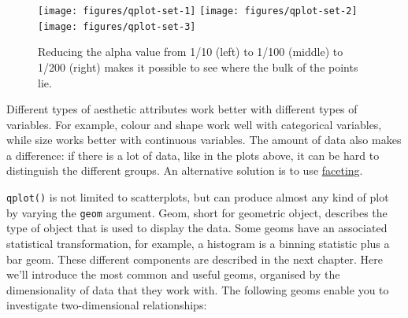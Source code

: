 \begin{Shaded}
\begin{Highlighting}[]
  \NormalTok{(}\NormalTok{/}\NormalTok{))}
  \NormalTok{(}\NormalTok{/}\NormalTok{))}
  \NormalTok{(}\NormalTok{/}\NormalTok{))}
\end{Highlighting}
\end{Shaded}

\begin{figure}
\texttt{[image: figures/qplot-set-1]} \texttt{[image: figures/qplot-set-2]} \texttt{[image: figures/qplot-set-3]} \caption{Reducing the alpha value from 1/10 (left) to 1/100 (middle) to 1/200 (right) makes it possible to see where the bulk of the points lie.\label{fig:qplot-set}}
\end{figure}

Different types of aesthetic attributes work better with different types
of variables. For example, colour and shape work well with categorical
variables, while size works better with continuous variables. The amount
of data also makes a difference: if there is a lot of data, like in the
plots above, it can be hard to distinguish the different groups. An
alternative solution is to use \hyperref[sec:qplot-faceting]{faceting}.


\texttt{qplot()} is not limited to scatterplots, but can produce almost
any kind of plot by varying the \texttt{geom} argument. Geom, short for
geometric object, describes the type of object that is used to display
the data. Some geoms have an associated statistical transformation, for
example, a histogram is a binning statistic plus a bar geom. These
different components are described in the next chapter. Here we'll
introduce the most common and useful geoms, organised by the
dimensionality of data that they work with. The following geoms enable
you to investigate two-dimensional relationships:

